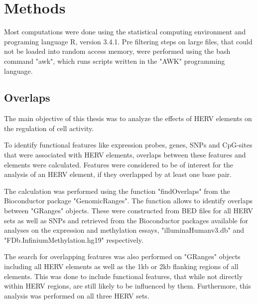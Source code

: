 \documentclass[a4paper,12pt,twoside,openright]{article}
\let\oldsection\section
\def\section{\cleardoublepage\oldsection}
\begin{document}



\newpage
\section{Methods}
\label{Methods}
Most computations were done using the statistical computing environment and programing language R, version 3.4.1\cite{Rlanguage}. Pre filtering steps on large files, that could not be loaded into random access memory, were performed using the bash command "awk", which runs scripts written in the "AWK" programming language.

\subsection{Overlaps}
\label{Methods:Overlaps}
The main objective of this thesis was to analyze the effects of HERV elements on the regulation of cell activity. 

To identify functional features like expression probes, genes, SNPs and CpG-sites that were associated with HERV elements, overlaps between these features and elements were calculated. Features were considered to be of interest for the analysis of an HERV element, if they overlapped by at least one base pair.

The calculation was performed using the function "findOverlaps" from the Bioconductor package "GenomicRanges"\cite{10.1371/journal.pcbi.1003118}. The function allows to identify overlaps between "GRanges" objects. These were constructed from BED files for all HERV sets as well as SNPs and retrieved from the Bioconductor packages available for analyses on the expression and methylation essays, "illuminaHumanv3.db"\cite{illuminaHumanv3.db} and "FDb.InfiniumMethylation.hg19"\cite{FDb.InfiniumMethylation.hg19} respectively.

The search for overlapping features was also performed on "GRanges" objects including all HERV elements as well as the 1kb or 2kb flanking regions of all elements. This was done to include functional features, that while not directly within HERV regions, are still likely to be influenced by them. Furthermore, this analysis was performed on all three HERV sets.
\end{document}
